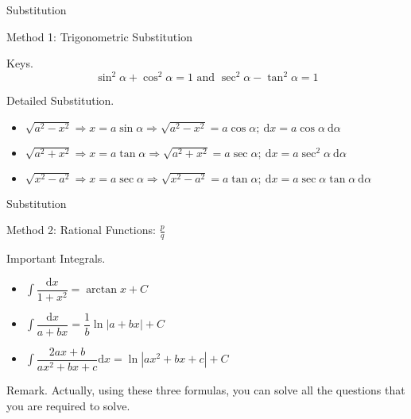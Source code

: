 \documentclass[aspectratio=169, UTF8]{ctexbeamer}
\begin{document}
    \begin{frame}[t]{Substitution}
        \begin{block}{Method 1: Trigonometric Substitution}
            \par \textcolor{yy}{Keys.}
            \begin{equation*}
                \sin^2\alpha + \cos^2\alpha = 1 \text{ and } 
                \sec^2\alpha - \tan^2\alpha = 1
            \end{equation*}
            \par \textcolor{yy}{Detailed Substitution.}
            \begin{itemize}
                \item $\sqrt{a^2-x^2}\Rightarrow x=a\sin \alpha\Rightarrow \sqrt{a^2-x^2}=a\cos \alpha;\ \mathrm{d}x=a\cos\alpha\ \mathrm{d}\alpha$
                \item $\sqrt{a^2+x^2}\Rightarrow x=a\tan \alpha\Rightarrow \sqrt{a^2+x^2}=a\sec \alpha;\ \mathrm{d}x=a\sec^2\alpha\ \mathrm{d}\alpha$
                \item $\sqrt{x^2-a^2}\Rightarrow x=a\sec \alpha\Rightarrow \sqrt{x^2-a^2}=a\tan \alpha;\ \mathrm{d}x=a\sec\alpha\tan\alpha\ \mathrm{d}\alpha$
            \end{itemize}
        \end{block}
    \end{frame}

    \begin{frame}[t]{Substitution}
        \begin{block}{Method 2: Rational Functions: $\frac{p}{q}$}
            \par \textcolor{yy}{Important Integrals.}
            \begin{itemize}
                \item $\int \dfrac{\mathrm{d}x}{1+x^2}=\arctan x+C$
                \item $\int \dfrac{\mathrm{d}x}{a+bx}=\dfrac{1}{b}\ln\left|a+bx\right|+C$
                \item $\int \dfrac{2ax+b}{ax^2+bx+c}\mathrm{d}x=\ln\left|ax^2+bx+c\right|+C$
            \end{itemize}
        \end{block}
        \par \textcolor{yy}{Remark.} Actually, using these three 
        formulas, you can solve all the questions that you are required to solve.
    \end{frame}
\end{document}
